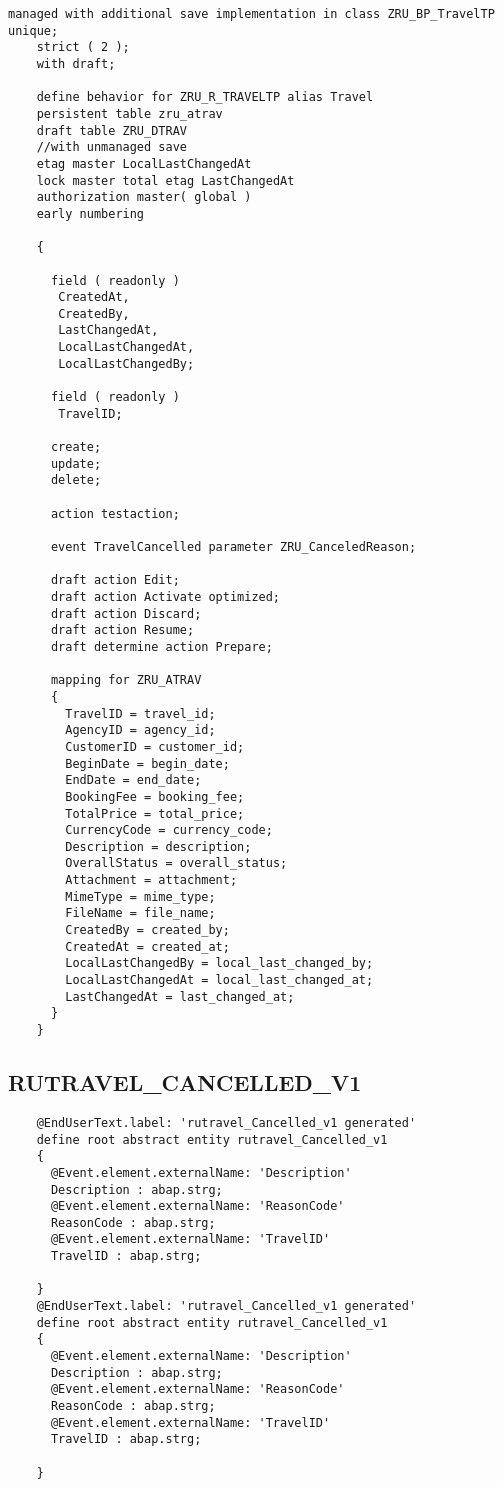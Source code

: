 \begin{Verbatim}[breaklines=true]
    managed with additional save implementation in class ZRU_BP_TravelTP unique;
    strict ( 2 );
    with draft;
    
    define behavior for ZRU_R_TRAVELTP alias Travel
    persistent table zru_atrav
    draft table ZRU_DTRAV
    //with unmanaged save
    etag master LocalLastChangedAt
    lock master total etag LastChangedAt
    authorization master( global )
    early numbering
    
    {
    
      field ( readonly )
       CreatedAt,
       CreatedBy,
       LastChangedAt,
       LocalLastChangedAt,
       LocalLastChangedBy;
    
      field ( readonly )
       TravelID;
    
      create;
      update;
      delete;
    
      action testaction;
    
      event TravelCancelled parameter ZRU_CanceledReason;
    
      draft action Edit;
      draft action Activate optimized;
      draft action Discard;
      draft action Resume;
      draft determine action Prepare;
    
      mapping for ZRU_ATRAV
      {
        TravelID = travel_id;
        AgencyID = agency_id;
        CustomerID = customer_id;
        BeginDate = begin_date;
        EndDate = end_date;
        BookingFee = booking_fee;
        TotalPrice = total_price;
        CurrencyCode = currency_code;
        Description = description;
        OverallStatus = overall_status;
        Attachment = attachment;
        MimeType = mime_type;
        FileName = file_name;
        CreatedBy = created_by;
        CreatedAt = created_at;
        LocalLastChangedBy = local_last_changed_by;
        LocalLastChangedAt = local_last_changed_at;
        LastChangedAt = last_changed_at;
      }
    }
\end{Verbatim}

\subsection{ RUTRAVEL\_CANCELLED\_V1 } 

\begin{verbatim}
    @EndUserText.label: 'rutravel_Cancelled_v1 generated'
    define root abstract entity rutravel_Cancelled_v1
    {
      @Event.element.externalName: 'Description'
      Description : abap.strg;
      @Event.element.externalName: 'ReasonCode'
      ReasonCode : abap.strg;
      @Event.element.externalName: 'TravelID'
      TravelID : abap.strg;
      
    }
    @EndUserText.label: 'rutravel_Cancelled_v1 generated'
    define root abstract entity rutravel_Cancelled_v1
    {
      @Event.element.externalName: 'Description'
      Description : abap.strg;
      @Event.element.externalName: 'ReasonCode'
      ReasonCode : abap.strg;
      @Event.element.externalName: 'TravelID'
      TravelID : abap.strg;
      
    }
        
\end{verbatim}


